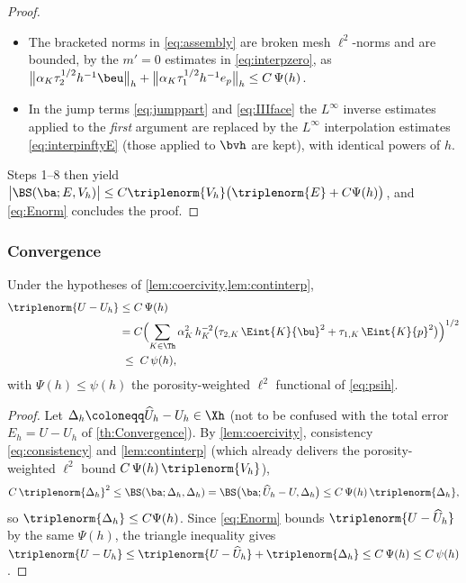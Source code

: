 \begin{proof}
\begin{itemize}[leftmargin=2em]
\begin{equation}
  + \tau_{1,K}(\Eint{K}{p})^2\bigr)\Bigr)^{1/2}
  = C\,\Psi(h),
\end{equation}
the middle expression being the porosity{\hyp}weighted $\ell^2$ functional $\Psi(h)$ of
\eqref{eq:psih} (and only afterwards, if desired, majorised by $\psi(h)$).
\item The bracketed norms in \eqref{eq:assembly} are broken mesh $\ell^2${\hyp}norms and are
bounded, by the $m'=0$ estimates in \eqref{eq:interpzero}, as
$\bigl\lVert\alpha_K\tau_2^{1/2}h^{-1}\beu\bigr\rVert_h
+\bigl\lVert\alpha_K\tau_1^{1/2}h^{-1}e_p\bigr\rVert_h\le C\,\Psi(h)$.
\item In the jump terms \eqref{eq:jumppart} and \eqref{eq:IIIface} the $L^\infty$ inverse
estimates applied to the \emph{first} argument are replaced by the $L^\infty$
interpolation estimates \eqref{eq:interpinftyE} (those applied to $\bvh$ are kept), with
identical powers of $h$.
\end{itemize}
Steps 1--8 then yield
$\bigl|\BS(\ba;E,V_h)\bigr|\le C\triplenorm{V_h}\bigl(\triplenorm{E}+C\Psi(h)\bigr)$, and
\eqref{eq:Enorm} concludes the proof.
\end{proof}

\subsubsection{Convergence}

\begin{theorem}[Convergence]\label{thm:convergence}
Under the hypotheses of \cref{lem:coercivity,lem:continterp},
\begin{equation}\label{eq:convergence}
\begin{aligned}
  \triplenorm{U-U_h}
  &\le C\,\Psi(h) \\
  &= C\Bigl(\sum_{K\in\Th}\alpha_K^2\,h_K^{-2}
  \bigl(\tau_{2,K}\,\Eint{K}{\bu}^2+\tau_{1,K}\,\Eint{K}{p}^2\bigr)\Bigr)^{1/2} \\
  &\;\le\; C\,\psi(h),
\end{aligned}
\end{equation}
with $\Psi(h)\le\psi(h)$ the porosity{\hyp}weighted $\ell^2$ functional of \eqref{eq:psih}.
\end{theorem}

\begin{proof}
Let $\Delta_h\coloneqq\widehat{U}_h-U_h\in\Xh$ (not to be confused with the total error
$E_h = U-U_h$ of \cref{th:Convergence}). By \cref{lem:coercivity},
consistency \eqref{eq:consistency} and \cref{lem:continterp} (which already delivers the
porosity{\hyp}weighted $\ell^2$ bound $C\,\Psi(h)\,\triplenorm{V_h}$),
\begin{equation*}
  C\,\triplenorm{\Delta_h}^2
  \le \BS(\ba;\Delta_h,\Delta_h)
  = \BS\bigl(\ba;\widehat{U}_h-U,\Delta_h\bigr)
  \le C\,\Psi(h)\,\triplenorm{\Delta_h},
\end{equation*}
so $\triplenorm{\Delta_h}\le C\Psi(h)$. Since \eqref{eq:Enorm} bounds
$\triplenorm{U-\widehat{U}_h}$ by the same $\Psi(h)$, the triangle inequality gives
$\triplenorm{U-U_h}\le\triplenorm{U-\widehat{U}_h}+\triplenorm{\Delta_h}\le C\,\Psi(h)\le C\,\psi(h)$.
\end{proof}

